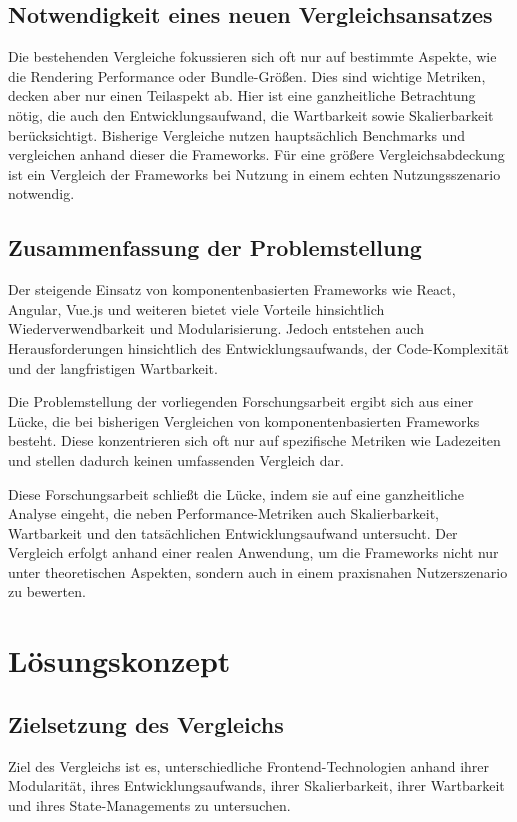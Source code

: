 \documentclass[oneside]{ausarbeitung}
\begin{document}
\section{Notwendigkeit eines neuen Vergleichsansatzes}

Die bestehenden Vergleiche fokussieren sich oft nur auf bestimmte Aspekte, wie die Rendering Performance oder Bundle-Größen. Dies sind wichtige Metriken, decken aber nur einen Teilaspekt ab. Hier ist eine ganzheitliche Betrachtung nötig, die auch den Entwicklungsaufwand, die Wartbarkeit sowie Skalierbarkeit berücksichtigt. Bisherige Vergleiche nutzen hauptsächlich Benchmarks und vergleichen anhand dieser die Frameworks. Für eine größere Vergleichsabdeckung ist ein Vergleich der Frameworks bei Nutzung in einem echten Nutzungsszenario notwendig. 

\section{Zusammenfassung der Problemstellung}
Der steigende Einsatz von komponentenbasierten Frameworks wie React, Angular, Vue.js und weiteren bietet viele Vorteile hinsichtlich Wiederverwendbarkeit und Modularisierung. Jedoch entstehen auch Herausforderungen hinsichtlich des Entwicklungsaufwands, der Code-Komplexität und der langfristigen Wartbarkeit.

Die Problemstellung der vorliegenden Forschungsarbeit ergibt sich aus einer Lücke, die bei bisherigen Vergleichen von komponentenbasierten Frameworks besteht. Diese konzentrieren sich oft nur auf spezifische Metriken wie Ladezeiten und stellen dadurch keinen umfassenden Vergleich dar.

Diese Forschungsarbeit schließt die Lücke, indem sie auf eine ganzheitliche Analyse eingeht, die neben Performance-Metriken auch Skalierbarkeit, Wartbarkeit und den tatsächlichen Entwicklungsaufwand untersucht. Der Vergleich erfolgt anhand einer realen Anwendung, um die Frameworks nicht nur unter theoretischen Aspekten, sondern auch in einem praxisnahen Nutzerszenario zu bewerten.

\chapter{Lösungskonzept}
\label{cha:loesungskonzept}

\section{Zielsetzung des Vergleichs}
Ziel des Vergleichs ist es, unterschiedliche Frontend-Technologien anhand ihrer Modularität, ihres Entwicklungsaufwands, ihrer Skalierbarkeit, ihrer Wartbarkeit und ihres State-Managements zu untersuchen.
\end{document}

